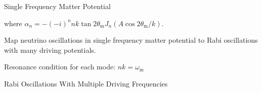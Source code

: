 \documentclass[9pt]{beamer}
\begin{document}
\begin{darkframes}
\begin{frame}{Single Frequency Matter Potential}
\begin{tcolorbox}[title=Hamiltonian in Rabi Basis]
where $\alpha_n =  - (-i)^n  n  k \tan 2\theta_{\mathrm{m}}  J_n ( A \cos 2\theta_{\mathrm{m}} / k )$.


\end{tcolorbox}





\pause

\begin{tcolorbox}
\centering
Map neutrino oscillations in single frequency matter potential to Rabi oscillations with many driving potentials.
\end{tcolorbox}


\begin{tcolorbox}
\centering
Resonance condition for each mode: $nk=\omega_{\mathrm m}$
\end{tcolorbox}




\end{frame}



\begin{frame}{Rabi Oscillations With Multiple Driving Frequencies}


\end{frame}
\end{darkframes}
\end{document}
